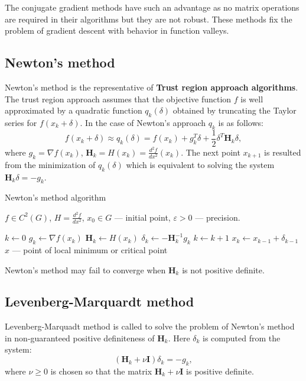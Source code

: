 \documentclass[12pt, bachelor, substylefile = algo_title.rtx]{disser}
\newcommand{\eps}{\varepsilon}
\theoremstyle{definition}
\begin{document}
The conjugate gradient methods have such an advantage as no matrix operations are required in their algorithms but they are not robust. These methods fix the problem of gradient descent with behavior in function valleys.

\subsection{Newton's method}
Newton's method is the representative of \textbf{Trust region approach algorithms}. The trust region approach assumes that the objective function $f$ is well approximated by a quadratic function $q_k (\delta)$ obtained by truncating the Taylor series for $f(x_k + \delta)$. In the case of Newton's approach $q_k$ is as follows:
\[ f(x_k + \delta) \approx q_k(\delta) = f(x_k) + g_k^T \delta + \frac{1}{2} \delta^T \mathbf{H}_k \delta, \]
where $g_k = \nabla f(x_k)$, $\mathbf{H}_k = H(x_k) = \frac{d^2 f}{dx^2}(x_k)$. The next point $x_{k+1}$ is resulted from the minimization of $q_k(\delta)$ which is equivalent to solving the system $\mathbf{H}_k \delta = -g_k$.

\begin{algorithm}[h]
\caption{Newton's method algorithm}
\label{alg: newton}
\begin{algorithmic}

\Require $f \in C^2(G)$, $H = \frac{d^2 f}{dx^2}$, $x_0 \in G$ --- initial point, $\eps>0$ --- precision. 

\State $k \gets 0$
\While{$\|x_k - x_{k-1}\| > \eps$}
\State $g_k \gets \nabla f(x_k)$
\State $\mathbf{H}_k \gets H(x_k)$
\State $\delta_k \gets -\mathbf{H}^{-1}_k g_k$
\State $k \gets k+1$
\State $x_k \gets x_{k-1} + \delta_{k-1}$
\EndWhile
\Ensure $\widehat{x}$ --- point of local minimum or critical point
\end{algorithmic}
\end{algorithm}

Newton’s method may fail to converge when $\mathbf{H}_k$ is not positive definite.

\subsection{Levenberg-Marquardt method}
Levenberg-Marquadt method is called to solve the problem of Newton's method in non-guaranteed positive definiteness of $\mathbf{H}_k$. Here $\delta_k$ is computed from the system:
\[ (\mathbf{H}_k + \nu \mathbf{I})\delta_k = -g_k, \]
where $\nu \ge 0$ is chosen so that the matrix $\mathbf{H}_k + \nu \mathbf{I}$ is positive definite.
\end{document}
